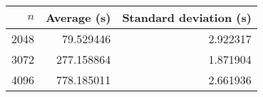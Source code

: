 \begin{tabular}{rrr}
$n$ & Average (s) & Standard deviation (s)\\\hline
2048 & 79.529446 & 2.922317\\
3072 & 277.158864 & 1.871904\\
4096 & 778.185011 & 2.661936\\
\end{tabular}
